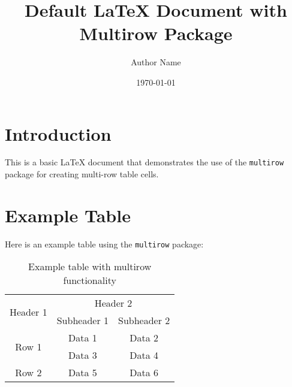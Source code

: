 \documentclass{article}
\begin{document}
\title{Default LaTeX Document with Multirow Package}
\author{Author Name}
\date{\today}
\maketitle

\section{Introduction}
This is a basic LaTeX document that demonstrates the use of the \texttt{multirow} package for creating multi-row table cells.

\section{Example Table}
Here is an example table using the \texttt{multirow} package:

\begin{table}[h]
    \centering
    \begin{tabular}{|c|c|c|}
        \hline
        \multirow{2}{*}{Header 1} & \multicolumn{2}{c|}{Header 2} \\
        \cline{2-3}
        & Subheader 1 & Subheader 2 \\
        \hline
        \multirow{2}{*}{Row 1} & Data 1 & Data 2 \\
        & Data 3 & Data 4 \\
        \hline
        Row 2 & Data 5 & Data 6 \\
        \hline
    \end{tabular}
    \caption{Example table with multirow functionality}
    \label{tab:example}
\end{table}
\end{document}
